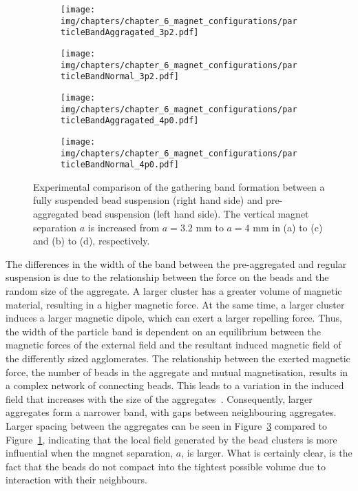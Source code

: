\begin{figure}[htb]
\centering
	\begin{subfigure}[b]{0.47\textwidth}
		\texttt{[image: img/chapters/chapter\_6\_magnet\_configurations/particleBandAggragated\_3p2.pdf]}
	\caption{}
    \label{fig:particleBandAggragated_3p2}
    \end{subfigure}
    \hfill
	\begin{subfigure}[b]{0.47\textwidth}
		\texttt{[image: img/chapters/chapter\_6\_magnet\_configurations/particleBandNormal\_3p2.pdf]}
	\caption{}
	\label{fig:particleBandNormal_3p2}
	\end{subfigure}
	\hfill
	\begin{subfigure}[b]{0.47\textwidth}
		\texttt{[image: img/chapters/chapter\_6\_magnet\_configurations/particleBandAggragated\_4p0.pdf]}
	\caption{}
	\label{fig:particleBandAggragated_4p0}
	\end{subfigure}
	\hfill
	\begin{subfigure}[b]{0.47\textwidth}
		\texttt{[image: img/chapters/chapter\_6\_magnet\_configurations/particleBandNormal\_4p0.pdf]}
	\caption{}
	\label{fig:particleBandNormal_4p0}
	\end{subfigure}
\caption[Particle band formation of magnetic bead aggregates]{Experimental comparison of the gathering band formation between a fully suspended bead suspension (right hand side) and pre-aggregated bead suspension (left hand side). The vertical magnet separation $a$ is increased from $a=3.2$ mm to $a=4$ mm in (a) to (c) and (b) to (d), respectively.}
\label{fig:particleBandNormalAndAggragated}
\end{figure}

The differences in the width of the band between the pre-aggregated and regular suspension is due to the relationship between the force on the beads and the random size of the aggregate. A larger cluster has a greater volume of magnetic material, resulting in a higher magnetic force. At the same time, a larger cluster induces a larger magnetic dipole, which can exert a larger repelling force. Thus, the width of the particle band is dependent on an equilibrium between the magnetic forces of the external field and the resultant induced magnetic field of the differently sized agglomerates. The relationship between the exerted magnetic force, the number of beads in the aggregate and mutual magnetisation, results in a complex network of connecting beads. This leads to a variation in the induced field that increases with the size of the aggregates~\cite{Moller2003}. Consequently, larger aggregates form a narrower band, with gaps between neighbouring aggregates. Larger spacing between the aggregates can be seen in Figure~\ref{fig:particleBandAggragated_4p0} compared to Figure~\ref{fig:particleBandAggragated_3p2}, indicating that the local field generated by the bead clusters is more influential when the magnet separation, $a$, is larger. What is certainly clear, is the fact that the beads do not compact into the tightest possible volume due to interaction with their neighbours. 

